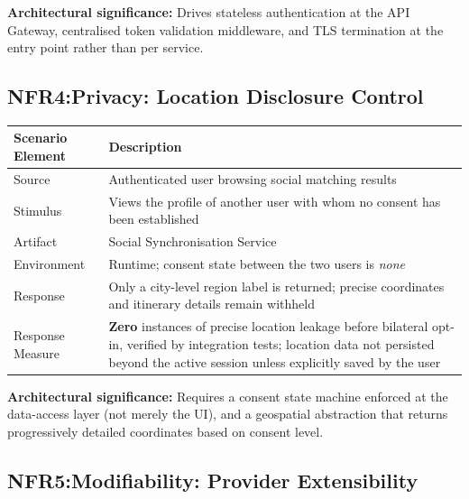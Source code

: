 \documentclass[12pt,a4paper]{article}
\begin{document}
\textbf{Architectural significance:} Drives stateless authentication at the API Gateway, centralised
token validation middleware, and TLS termination at the entry point rather than per service.

\vspace{1em}

\subsection{NFR4:Privacy: Location Disclosure Control}

\begin{tabularx}{\textwidth}{L{3.5cm}X}
\toprule
\textbf{Scenario Element} & \textbf{Description} \\
\midrule
Source            & Authenticated user browsing social matching results \\
Stimulus          & Views the profile of another user with whom no consent has been established \\
Artifact          & Social Synchronisation Service \\
Environment       & Runtime; consent state between the two users is \textit{none} \\
Response          & Only a city-level region label is returned; precise coordinates and
                    itinerary details remain withheld \\
Response Measure  & \textbf{Zero} instances of precise location leakage before bilateral opt-in,
                    verified by integration tests; location data not persisted beyond the active
                    session unless explicitly saved by the user \\
\bottomrule
\end{tabularx}

\textbf{Architectural significance:} Requires a consent state machine enforced at the data-access
layer (not merely the UI), and a geospatial abstraction that returns progressively detailed
coordinates based on consent level.

\vspace{1em}

\subsection{NFR5:Modifiability: Provider Extensibility}
\end{document}
